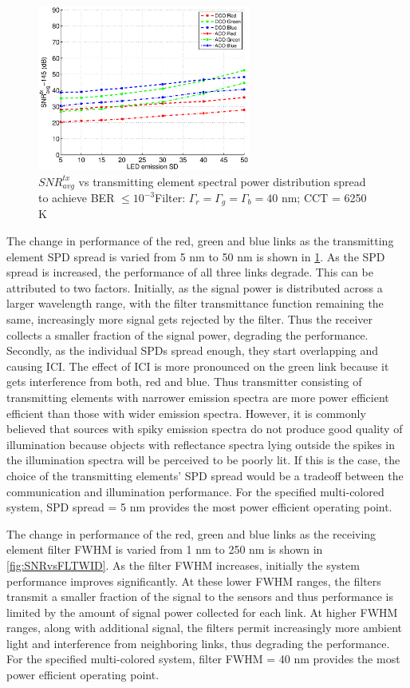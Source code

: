 \begin{figure}[!b]
	\centering
		\includegraphics[trim={0.15in 0.05in 0.05in 0.35in}, clip=true, width=2.75in]{img/SNRvsLEDSD.eps}
	\caption{$SNR_{avg}^{tx}$ vs transmitting element spectral power distribution spread to achieve BER $\leq 10^{-3}$\newline Filter: $\Gamma_r = \Gamma_g = \Gamma_b = 40$ nm; CCT = 6250 K}
	\label{fig:SNRvsLEDSD}
\end{figure}

The change in performance of the red, green and blue links as the transmitting element SPD spread is varied from 5 nm to 50 nm is shown in \figurename{\ref{fig:SNRvsLEDSD}}. As the SPD spread is increased, the performance of all three links degrade. This can be attributed to two factors. Initially, as the signal power is distributed across a larger wavelength range, with the filter transmittance function remaining the same, increasingly more signal gets rejected by the filter. Thus the receiver collects a smaller fraction of the signal power, degrading the performance. Secondly, as the individual SPDs spread enough, they start overlapping and causing ICI. The effect of ICI is more pronounced on the green link because it gets interference from both, red and blue. Thus transmitter consisting of transmitting elements with narrower emission spectra are more power efficient efficient than those with wider emission spectra. However, it is commonly believed that sources with spiky emission spectra do not produce good quality of illumination because objects with reflectance spectra lying outside the spikes in the illumination spectra will be perceived to be poorly lit. If this is the case, the choice of the transmitting elements' SPD spread would be a tradeoff between the communication and illumination performance. For the specified multi-colored system, SPD spread = 5 nm provides the most power efficient operating point.

The change in performance of the red, green and blue links as the receiving element filter FWHM is varied from 1 nm to 250 nm is shown in \figurename{\ref{fig:SNRvsFLTWID}}. As the filter FWHM increases, initially the system performance improves significantly. At these lower FWHM ranges, the filters transmit a smaller fraction of the signal to the sensors and thus performance is limited by the amount of signal power collected for each link. At higher FWHM ranges, along with additional signal, the filters permit increasingly more ambient light and interference from neighboring links, thus degrading the performance. For the specified multi-colored system, filter FWHM = 40 nm provides the most power efficient operating point.

